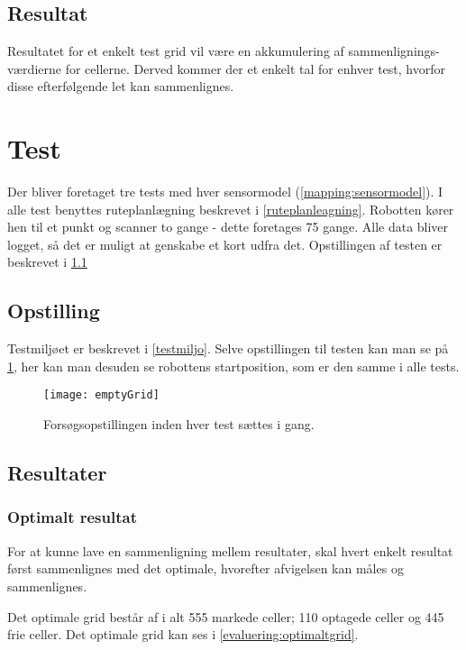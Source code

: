 \subsection{Resultat}
Resultatet for et enkelt test grid vil være en akkumulering af sammenlignings-værdierne for cellerne.
Derved kommer der et enkelt tal for enhver test, hvorfor disse efterfølgende let kan sammenlignes.

\section{Test}\label{evaluering:test_beskrivelse}
Der bliver foretaget tre tests med hver sensormodel (\cref{mapping:sensormodel}).
I alle test benyttes ruteplanlægning beskrevet i \cref{ruteplanleagning}.
Robotten kører hen til et punkt og scanner to gange - dette foretages 75 gange.
Alle data bliver logget, så det er muligt at genskabe et kort udfra det.
Opstillingen af testen er beskrevet i \cref{evaluering:opstilling}

\subsection{Opstilling}\label{evaluering:opstilling}
Testmiljøet er beskrevet i \cref{testmiljo}.
Selve opstillingen til testen kan man se på \cref{evaluering:emptyGrid}, her kan man desuden se robottens startposition, som er den samme i alle tests.

\begin{figure}[h]
\texttt{[image: emptyGrid]}
\caption{Forsøgsopstillingen inden hver test sættes i gang.}
\label{evaluering:emptyGrid}
\end{figure}

\subsection{Resultater}

\subsubsection{Optimalt resultat}
For at kunne lave en sammenligning mellem resultater, skal hvert enkelt resultat først sammenlignes med det optimale, hvorefter afvigelsen kan måles og sammenlignes.

Det optimale grid består af i alt 555 markede celler; 110 optagede celler og 445 frie celler.
Det optimale grid kan ses i \cref{evaluering:optimaltgrid}.

